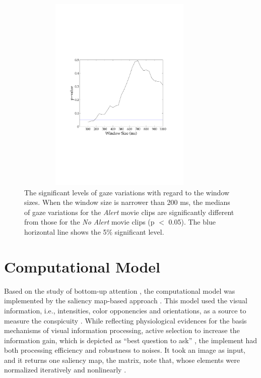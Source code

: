 \documentclass[oneside,master]{snueethesis}
\begin{document}
\begin{figure}
  \centerline{\includegraphics[width=100mm,height=95mm,trim=28mm 75mm 28mm 76mm]{./eps/gaze_var.pdf}}
  \caption[The significant levels of gaze variations with regard to the window sizes]{The significant levels of gaze variations with regard to the window sizes. When the window size is narrower than 200 ms, the medians of gaze variations for the \textit{Alert} movie clips are significantly different from those for the \textit{No Alert} movie clips (p $<$ 0.05). The blue horizontal line shows the 5\% significant level.}
  \label{fig:gaze-variation}
\end{figure}


\section{Computational Model}

Based on the study of bottom-up attention \cite{koch1985shifts}, the computational model was implemented by the saliency map-based approach \cite{itti1998model}. This model used the visual information, i.e., intensities, color opponencies and orientations, as a source to measure the conspicuity \cite{Parkhurst2002}. While reflecting physiological evidences for the basis mechanisms of visual information processing, active selection to increase the information gain, which is depicted as ``best question to ask'' \cite{Reinagel1999,zetzsche1998investigation}, the implement had both processing efficiency and robustness to noises. It took an image as input, and it returns one saliency map, the matrix, note that, whose elements were normalized iteratively and nonlinearly \cite{itti2000saliency}.
\end{document}
